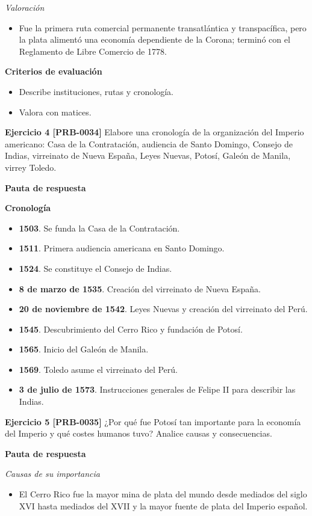 \documentclass{book}
\begin{document}
\noindent\textit{Valoración}
\begin{itemize}
\item Fue la primera ruta comercial permanente transatlántica y transpacífica, pero la plata alimentó una economía dependiente de la Corona; terminó con el Reglamento de Libre Comercio de 1778.
\end{itemize}

\noindent\textbf{Criterios de evaluación}
\begin{itemize}
\item Describe instituciones, rutas y cronología.
\item Valora con matices.
\end{itemize}

\noindent\textbf{Ejercicio 4 [PRB-0034]}
Elabore una cronología de la organización del Imperio americano: Casa de la Contratación, audiencia de Santo Domingo, Consejo de Indias, virreinato de Nueva España, Leyes Nuevas, Potosí, Galeón de Manila, virrey Toledo.


\noindent\textbf{Pauta de respuesta}

\noindent\textbf{Cronología}
\begin{itemize}
\item \textbf{1503}. Se funda la Casa de la Contratación.
\item \textbf{1511}. Primera audiencia americana en Santo Domingo.
\item \textbf{1524}. Se constituye el Consejo de Indias.
\item \textbf{8 de marzo de 1535}. Creación del virreinato de Nueva España.
\item \textbf{20 de noviembre de 1542}. Leyes Nuevas y creación del virreinato del Perú.
\item \textbf{1545}. Descubrimiento del Cerro Rico y fundación de Potosí.
\item \textbf{1565}. Inicio del Galeón de Manila.
\item \textbf{1569}. Toledo asume el virreinato del Perú.
\item \textbf{3 de julio de 1573}. Instrucciones generales de Felipe II para describir las Indias.
\end{itemize}

\noindent\textbf{Ejercicio 5 [PRB-0035]}
¿Por qué fue Potosí tan importante para la economía del Imperio y qué costes humanos tuvo? Analice causas y consecuencias.


\noindent\textbf{Pauta de respuesta}

\noindent\textit{Causas de su importancia}
\begin{itemize}
\item El Cerro Rico fue la mayor mina de plata del mundo desde mediados del siglo XVI hasta mediados del XVII y la mayor fuente de plata del Imperio español.
\end{itemize}
\end{document}
